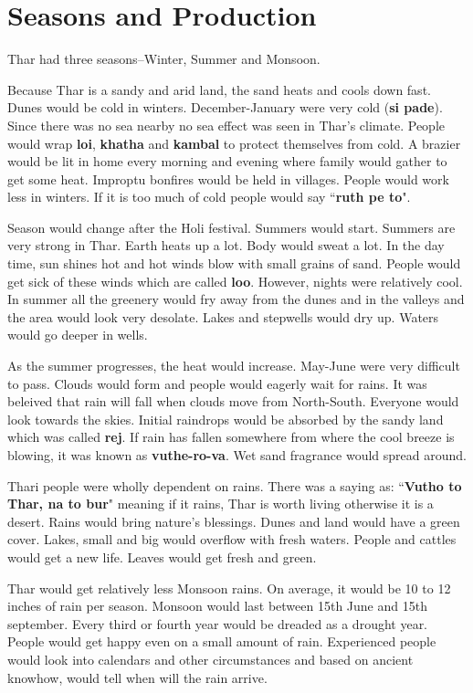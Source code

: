 \chapter{Seasons and Production}
Thar had three seasons--Winter, Summer and Monsoon.

Because Thar is a sandy and arid land, the sand heats and cools down fast.
Dunes would be cold in winters. December-January were very cold (\textbf{si
pade}). Since there was no sea nearby no sea effect was seen in Thar's climate.
People would wrap \textbf{loi}, \textbf{khatha} and \textbf{kambal} to protect
themselves from cold. A brazier would be lit in home every morning and evening
where family would gather to get some heat. Improptu bonfires would be held in
villages. People would work less in winters. If it is too much of cold people
would say ``\textbf{ruth pe to}".

Season would change after the Holi festival. Summers would start. Summers are
very strong in Thar. Earth heats up a lot. Body would sweat a lot. In the day
time, sun shines hot and hot winds blow with small grains of sand. People would
get sick of these winds which are called \textbf{loo}. However, nights were
relatively cool. In summer all the greenery would fry away from the dunes and
in the valleys and the area would look very desolate. Lakes and stepwells would
dry up. Waters would go deeper in wells.

As the summer progresses, the heat would increase. May-June were very difficult
to pass. Clouds would form and people would eagerly wait for rains. It was
beleived that rain will fall when clouds move from North-South. Everyone would
look towards the skies. Initial raindrops would be absorbed by the sandy land
which was called \textbf{rej}. If rain has fallen somewhere from where the cool
breeze is blowing, it was known as \textbf{vuthe-ro-va}. Wet sand fragrance
would spread around.

Thari people were wholly dependent on rains. There was a saying as:
``\textbf{Vutho to Thar, na to bur}" meaning if it rains, Thar is worth living
otherwise it is a desert. Rains would bring nature's blessings. Dunes and land
would have a green cover. Lakes, small and big would overflow with fresh
waters. People and cattles would get a new life. Leaves would get fresh and
green.

Thar would get relatively less Monsoon rains. On average, it would be 10 to 12
inches of rain per season. Monsoon would last between 15th June and 15th
september. Every third or fourth year would be dreaded as a drought year.
People would get happy even on a small amount of rain. Experienced people would
look into calendars and other circumstances and based on ancient knowhow, would
tell when will the rain arrive.

